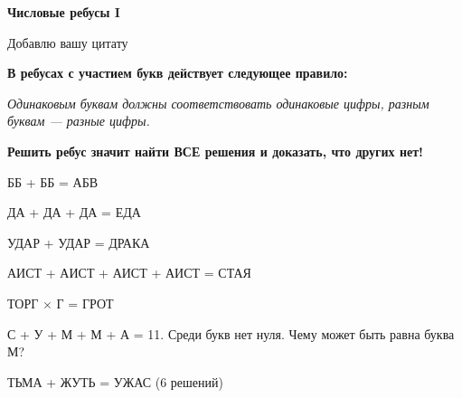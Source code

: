 \centerline{\bf \Huge Числовые ребусы I}

\begin{flushright}
        \scriptsize{Добавлю вашу цитату}
\end{flushright}

\textbf{В ребусах с участием букв действует следующее правило: }

\textit{Одинаковым буквам должны соответствовать одинаковые цифры, разным буквам — разные цифры.}

\textbf{Решить ребус значит найти ВСЕ решения и доказать, что других нет!}

 ББ + ББ = АБВ

 ДА + ДА + ДА = ЕДА

 УДАР + УДАР = ДРАКА

 АИСТ + АИСТ + АИСТ + АИСТ = СТАЯ

 ТОРГ $\times$ Г = ГРОТ

 С + У + М + М + А = 11. Среди букв нет нуля. Чему может быть равна буква М?

 ТЬМА + ЖУТЬ = УЖАС (6 решений)